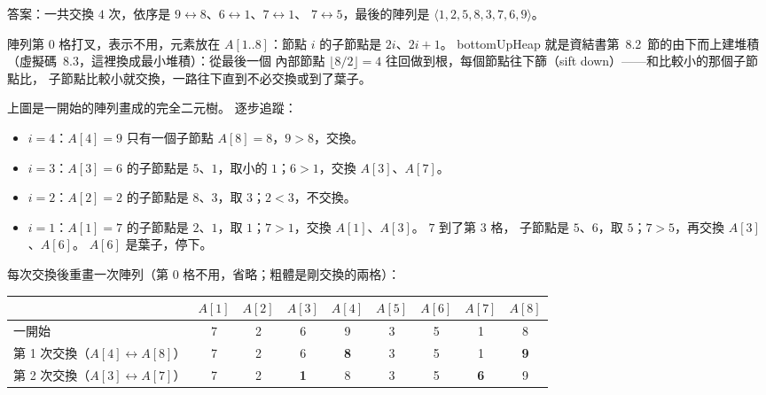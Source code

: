\begin{pastsoln}
答案：一共交換 $4$ 次，依序是 $9 \leftrightarrow 8$、$6 \leftrightarrow 1$、$7 \leftrightarrow 1$、
$7 \leftrightarrow 5$，最後的陣列是 $\langle 1, 2, 5, 8, 3, 7, 6, 9 \rangle$。

陣列第 $0$ 格打叉，表示不用，元素放在 $A[1..8]$：節點 $i$ 的子節點是 $2i$、$2i + 1$。
\textsf{bottomUpHeap} 就是資結書第~8.2~節的由下而上建堆積（虛擬碼~8.3，這裡換成最小堆積）：從最後一個
內部節點 $\lfloor 8/2 \rfloor = 4$ 往回做到根，每個節點往下篩（sift down）——和比較小的那個子節點比，
子節點比較小就交換，一路往下直到不必交換或到了葉子。

\begin{center}
\end{center}
上圖是一開始的陣列畫成的完全二元樹。 逐步追蹤：
\begin{itemize}
\item $i = 4$：$A[4] = 9$ 只有一個子節點 $A[8] = 8$，$9 > 8$，交換。
\item $i = 3$：$A[3] = 6$ 的子節點是 $5$、$1$，取小的 $1$；$6 > 1$，交換 $A[3]$、$A[7]$。
\item $i = 2$：$A[2] = 2$ 的子節點是 $8$、$3$，取 $3$；$2 < 3$，不交換。
\item $i = 1$：$A[1] = 7$ 的子節點是 $2$、$1$，取 $1$；$7 > 1$，交換 $A[1]$、$A[3]$。 $7$ 到了第 $3$ 格，
子節點是 $5$、$6$，取 $5$；$7 > 5$，再交換 $A[3]$、$A[6]$。 $A[6]$ 是葉子，停下。
\end{itemize}
每次交換後重畫一次陣列（第 $0$ 格不用，省略；粗體是剛交換的兩格）：
\begin{center}
\begin{tabular}{lcccccccc}
\toprule
 & $A[1]$ & $A[2]$ & $A[3]$ & $A[4]$ & $A[5]$ & $A[6]$ & $A[7]$ & $A[8]$ \\
\midrule
一開始 & 7 & 2 & 6 & 9 & 3 & 5 & 1 & 8 \\
第 1 次交換（$A[4] \leftrightarrow A[8]$） & 7 & 2 & 6 & \textbf{8} & 3 & 5 & 1 & \textbf{9} \\
第 2 次交換（$A[3] \leftrightarrow A[7]$） & 7 & 2 & \textbf{1} & 8 & 3 & 5 & \textbf{6} & 9 \\

\end{tabular}
\end{center}
\end{pastsoln}
